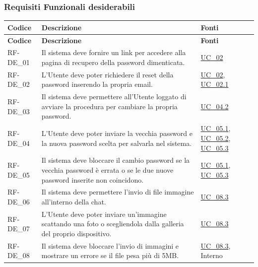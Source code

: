 \subsubsection{Requisiti Funzionali desiderabili}
\renewcommand{\arraystretch}{1.15}
\begin{longtable}{|>{\raggedright}p{}|>{\raggedright\arraybackslash}p{}|>{\raggedright\arraybackslash}p{}|}
    \hline
    \rowcolor[gray]{0.9}
    \textbf{Codice} & \textbf{Descrizione} & \textbf{Fonti} \\
    \hline
    \endfirsthead
    
    \hline
    \rowcolor[gray]{0.9}
    \textbf{Codice} & \textbf{Descrizione} & \textbf{Fonti}  \\
    \hline
    \endhead
    
    \hline
    RF-DE\_01 \hypertarget{rf-de_1} & Il sistema deve fornire un link per accedere alla pagina di recupero della password dimenticata. & \hyperref[uc_02]{UC\_02} \\
    \hline
    RF-DE\_02 \hypertarget{rf-de_2} & L'Utente deve poter richiedere il reset della password inserendo la propria email. & \hyperref[uc_02]{UC\_02}, \hyperref[uc_02.1]{UC\_02.1} \\
    \hline
    RF-DE\_03 \hypertarget{rf-de_3} & Il sistema deve permettere all'Utente loggato di avviare la procedura per cambiare la propria password. & \hyperref[uc_04.2]{UC\_04.2} \\
    \hline
    RF-DE\_04 \hypertarget{rf-de_4} & L'Utente deve poter inviare la vecchia password e la nuova password scelta per salvarla nel sistema. & \hyperref[uc_05.1]{UC\_05.1}, \hyperref[uc_05.2]{UC\_05.2}, \hyperref[uc_05.3]{UC\_05.3} \\
    \hline
    RF-DE\_05 \hypertarget{rf-de_5} & Il sistema deve bloccare il cambio password se la vecchia password è errata o se le due nuove password inserite non coincidono. & \hyperref[uc_05.1]{UC\_05.1}, \hyperref[uc_05.3]{UC\_05.3} \\
    \hline
    RF-DE\_06 \hypertarget{rf-de_6} & Il sistema deve permettere l'invio di file immagine all'interno della chat. & \hyperref[uc_08.3]{UC\_08.3} \\
    \hline
    RF-DE\_07 \hypertarget{rf-de_7} & L'Utente deve poter inviare un'immagine scattando una foto o scegliendola dalla galleria del proprio dispositivo. & \hyperref[uc_08.3]{UC\_08.3} \\
    \hline
    RF-DE\_08 \hypertarget{rf-de_8} & Il sistema deve bloccare l'invio di immagini e mostrare un errore se il file pesa più di 5MB. & \hyperref[uc_08.3]{UC\_08.3}, Interno \\

\end{longtable}
